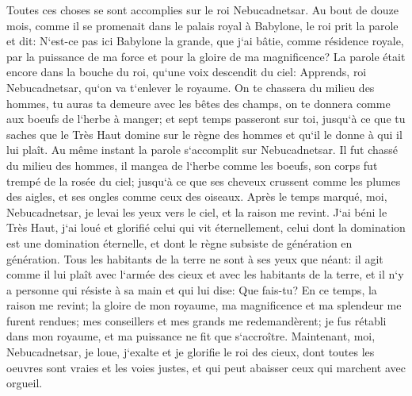 \verse Toutes ces choses se sont accomplies sur le roi Nebucadnetsar. 
\verse Au bout de douze mois, comme il se promenait dans le palais royal à Babylone, 
\verse le roi prit la parole et dit: N`est-ce pas ici Babylone la grande, que j`ai bâtie, comme résidence royale, par la puissance de ma force et pour la gloire de ma magnificence? 
\verse La parole était encore dans la bouche du roi, qu`une voix descendit du ciel: Apprends, roi Nebucadnetsar, qu`on va t`enlever le royaume. 
\verse On te chassera du milieu des hommes, tu auras ta demeure avec les bêtes des champs, on te donnera comme aux boeufs de l`herbe à manger; et sept temps passeront sur toi, jusqu`à ce que tu saches que le Très Haut domine sur le règne des hommes et qu`il le donne à qui il lui plaît. 
\verse Au même instant la parole s`accomplit sur Nebucadnetsar. Il fut chassé du milieu des hommes, il mangea de l`herbe comme les boeufs, son corps fut trempé de la rosée du ciel; jusqu`à ce que ses cheveux crussent comme les plumes des aigles, et ses ongles comme ceux des oiseaux. 
\verse Après le temps marqué, moi, Nebucadnetsar, je levai les yeux vers le ciel, et la raison me revint. J`ai béni le Très Haut, j`ai loué et glorifié celui qui vit éternellement, celui dont la domination est une domination éternelle, et dont le règne subsiste de génération en génération. 
\verse Tous les habitants de la terre ne sont à ses yeux que néant: il agit comme il lui plaît avec l`armée des cieux et avec les habitants de la terre, et il n`y a personne qui résiste à sa main et qui lui dise: Que fais-tu? 
\verse En ce temps, la raison me revint; la gloire de mon royaume, ma magnificence et ma splendeur me furent rendues; mes conseillers et mes grands me redemandèrent; je fus rétabli dans mon royaume, et ma puissance ne fit que s`accroître. 
\verse Maintenant, moi, Nebucadnetsar, je loue, j`exalte et je glorifie le roi des cieux, dont toutes les oeuvres sont vraies et les voies justes, et qui peut abaisser ceux qui marchent avec orgueil. 

